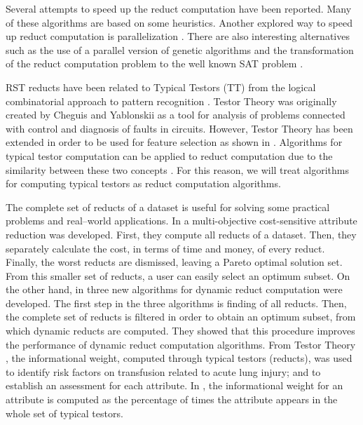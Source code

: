 \documentclass[citenumber]{elsarticle}
\begin{document}
	Several attempts to speed up the reduct computation have been reported. Many of these algorithms are based on some heuristics. Another explored way to speed up reduct computation is parallelization \cite{Strakowski08}. There are also interesting alternatives such as the use of a parallel version of genetic algorithms \cite{Wroblewski98} and the transformation of the reduct computation problem to the well known SAT problem \cite{Jensen14}.
	
	RST reducts have been related to Typical Testors (TT) from the logical combinatorial approach to pattern recognition \cite{Chikalov2013}. Testor Theory was originally created by Cheguis and Yablonskii \cite{Cheguis55} as a tool for analysis of problems connected with control and diagnosis of faults in circuits. However, Testor Theory has been extended in order to be used for feature selection as shown in \cite{Dmitriev1966,Martinez01,Ruiz08}. Algorithms for typical testor computation can be applied to reduct computation due to the similarity between these two concepts \cite{Lazo15}. For this reason, we will treat algorithms for computing typical testors as reduct computation algorithms.
	
	The complete set of reducts of a dataset is useful for solving some practical problems and real--world applications. In \cite{Xu2013} a multi-objective cost-sensitive attribute reduction was developed. First, they compute all reducts of a dataset. Then, they separately calculate the cost, in terms of time and money, of every reduct. Finally, the worst reducts are dismissed, leaving a Pareto optimal solution set. From this smaller set of reducts, a user can easily select an optimum subset. On the other hand, in \cite{Mukamakuza2014} three new algorithms for dynamic reduct computation were developed. The first step in the three algorithms is finding of all reducts. Then, the complete set of reducts is filtered in order to obtain an optimum subset, from which dynamic reducts are computed. They showed that this procedure improves the performance of dynamic reduct computation algorithms. From Testor Theory \cite{Torres2014}, the informational weight, computed through typical testors (reducts), was used to identify risk factors on transfusion related to acute lung injury; and to establish an assessment for each attribute. In \cite{Torres2014}, the informational weight for an attribute is computed as the percentage of times the attribute appears in the whole set of typical testors. 
	  
\end{document}
